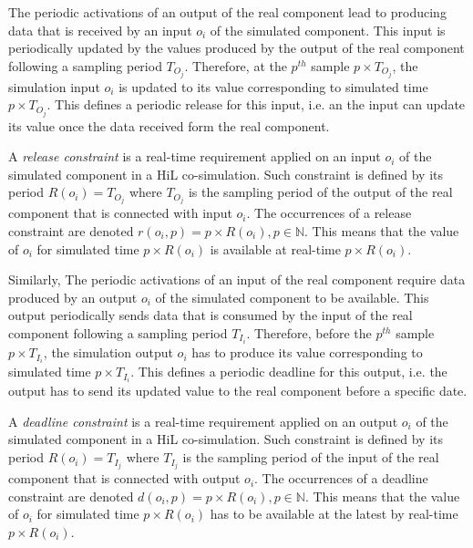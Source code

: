 The periodic activations of an output of the real component lead to producing data that is received by an input $o_i$ of the simulated component. This input is periodically updated by the values produced by the output of the real component following a sampling period $T_{O_j}$. Therefore, at the $p^{th}$ sample $p \times T_{O_j}$, the simulation input $o_i$ is updated to its value corresponding to simulated time $p \times T_{O_j}$. This defines a periodic release for this input, i.e. an the input can update its value once the data received form the real component.

\begin{definition}
A \textit{release constraint} is a real-time requirement applied on an input $o_i$ of the simulated component in a HiL co-simulation. Such constraint is defined by its period $R(o_i) = T_{O_j}$ where $T_{O_j}$ is the sampling period of the output of the real component that is connected with input $o_i$. The occurrences of a release constraint are denoted $r(o_i,p) = p \times R(o_i), p \in \mathbb{N}$. This means that the value of $o_i$ for simulated time $p \times R(o_i)$ is available at real-time $p \times R(o_i)$.
\label{def:release}
\end{definition}

Similarly, The periodic activations of an input of the real component require data produced by an output $o_i$ of the simulated component to be available. This output periodically sends data that is consumed by the input of the real component following a sampling period $T_{I_i}$. Therefore, before the $p^{th}$ sample $p \times T_{I_i}$, the simulation output $o_i$ has to produce its value corresponding to simulated time $p \times T_{I_i}$. This defines a periodic deadline for this output, i.e. the output has to send its updated value to the real component before a specific date.

\begin{definition}
A \textit{deadline constraint} is a real-time requirement applied on an output $o_i$ of the simulated component in a HiL co-simulation. Such constraint is defined by its period $R(o_i) = T_{I_j}$ where $T_{I_j}$ is the sampling period of the input of the real component that is connected with output $o_i$. The occurrences of a deadline constraint are denoted $d(o_i,p) = p \times R(o_i), p \in \mathbb{N}$. This means that the value of $o_i$ for simulated time $p \times R(o_i)$ has to be available at the latest by real-time $p \times R(o_i)$.
\label{def:deadline}
\end{definition}

